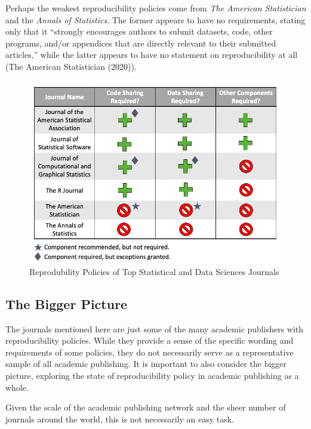 \documentclass[12pt,twoside]{reedthesis}
\begin{document}
Perhaps the weakest reproducibility policies come from \emph{The American Statistician} and the \emph{Annals of Statistics}. The former appears to have no requirements, stating only that it ``strongly encourages authors to submit datasets, code, other programs, and/or appendices that are directly relevant to their submitted articles,'' while the latter appears to have no statement on reproducibility at all (The American Statistician (2020)).
\begin{figure}

{\centering \includegraphics[width=1\linewidth]{figure/stats-journals} 

}

\caption{Reprodubility Policies of Top Statistical and Data Sciences Journals}\label{fig:unnamed-chunk-4}
\end{figure}
\hypertarget{the-bigger-picture}{%
\subsection{The Bigger Picture}\label{the-bigger-picture}}

The journals mentioned here are just some of the many academic publishers with reproducibility policies. While they provide a sense of the specific wording and requirements of some policies, they do not necessarily serve as a representative sample of all academic publishing. It is important to also consider the bigger picture, exploring the state of reproducibility policy in academic publishing as a whole.

Given the scale of the academic publishing network and the sheer number of journals around the world, this is not necessarily an easy task.
\end{document}
